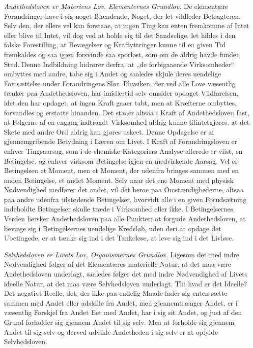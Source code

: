 \documentclass[11pt]{book}
\newcommand{\opage}[1]{\marginnote{\footnotesize\textit{[#1]}}}
\begin{document}
\emph{Andethedsloven er Materiens Lov, Elementernes Grundlov.} De
elementære Forandringer have i sig noget Blændende, Noget, der let vildleder
Betragteren. Selv den, der ellers vel kan forstaae, at ingen Ting kan enten
fremkomme af Intet eller blive til Intet, vil dog ved at holde sig til det
Sandselige, let hildes i den falske Forestilling, at Bevægelser og
Kraftyttringer kunne til en given Tid fremkaldes og saa igjen forsvinde saa
sporløst, som om de aldrig havde fundet Sted. Denne Indbildning hidrører
derfra, at „de forbigaaende Virksomheder“ ombyttes med andre, tabe sig i
Andet og saaledes skjule deres uendelige Fortsættelse under Forandringens
Slør. Physiken, der ved alle Love væsentlig tænker paa Andethedsloven, har
imidlertid selv omsider opdaget Vildfarelsen, idet den har opdaget, at ingen
Kraft gaaer tabt, men at Kræfterne ombyttes, forvandles og erstatte
hinanden. Det staaer altsaa i Kraft af Andethedsloven fast, at Følgerne af
en engang indtraadt Virksomhed aldrig kunne tilintetgjøres, at det Skete med
andre Ord aldrig kan gjøres uskeet. Denne Opdagelse er af gjennemgribende
Betydning i Læren om Livet. I Kraft af Forandringsloven er enhver
Tingsaarsag, som i de chemiske Kategoriers Analyse allerede er viist, en
Betingelse, og enhver virksom
\opage{280} \setcounter{footnote}{0}%
Betingelse igjen en medvirkende Aarsag. Vel er Betingelsen et Moment, men et
Moment, der udenfra bringes sammen med en anden Betingelse, et andet Moment.
Selv naar det ene Moment med physisk Nødvendighed medfører det andet, vil
det beroe paa Omstændighederne, altsaa paa andre udenfra tilstødende
Betingelser, hvorvidt alle i en given Forudsætning indeholdte Betingelser
skulle træde i Virksomhed eller ikke. I Betingelsernes Verden hersker
Andethedsloven paa alle Punkter: at forgude Andethedsloven, at bevæge sig i
Betingelsernes uendelige Kredsløb, uden deri at opdage det Ubetingede, er at
tænke sig ind i det Tankeløse, at leve sig ind i det Livløse.

\emph{Selvhedsloven er Livets Lov, Organismernes Grundlov.} Ligesom det med
indre Nødvendighed følger af det Elementæres materielle Natur, at det maa
være Andethedsloven underlagt, saaledes følger det med indre Nødvendighed af
Livets ideelle Natur, at det maa være Selvhedsloven underlagt. Thi hvad er
det Ideelle? Det negativt Reelle, det, der ikke paa endelig Maade lader sig
enten sætte sammen med Andet eller adskille fra Andet, men gjennemtrænger
Andet, er i væsentlig Forskjel fra Andet Eet med Andet, har i sig sit Andet,
og just af den Grund forholder sig gjennem Andet til sig selv. Men at
forholde sig gjennem Andet til sig selv og derved udvikle Andetheden i sig
selv er at opfylde Selvhedsloven.
\end{document}
